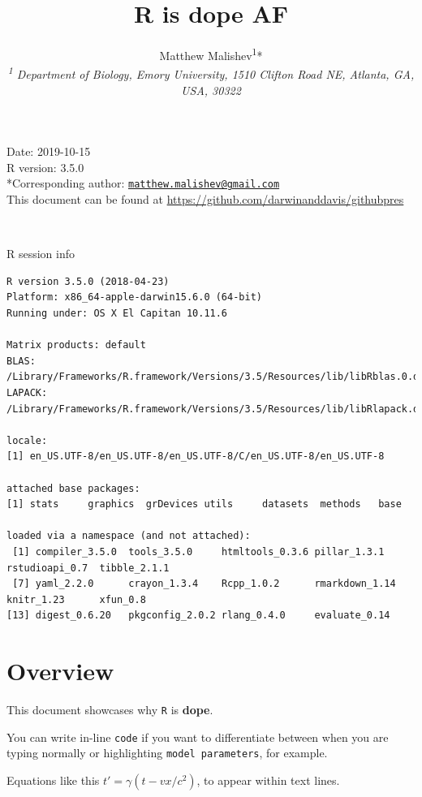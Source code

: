 \documentclass[10,portrait]{article}
\title{R is dope AF}
\author{Matthew
Malishev\textsuperscript{1}*\\[2\baselineskip]\emph{\textsuperscript{1}
Department of Biology, Emory University, 1510 Clifton Road NE, Atlanta,
GA, USA, 30322}}
\date{}
\begin{document}
\maketitle

{
\hypersetup{linkcolor=black}
\setcounter{tocdepth}{4}
\tableofcontents
}
\newpage   

Date: 2019-10-15\\
R version: 3.5.0\\
*Corresponding author:
\href{mailto:matthew.malishev@gmail.com}{\nolinkurl{matthew.malishev@gmail.com}}\\
This document can be found at
\url{https://github.com/darwinanddavis/githubpres}

~

R session info

\begin{verbatim}
R version 3.5.0 (2018-04-23)
Platform: x86_64-apple-darwin15.6.0 (64-bit)
Running under: OS X El Capitan 10.11.6

Matrix products: default
BLAS: /Library/Frameworks/R.framework/Versions/3.5/Resources/lib/libRblas.0.dylib
LAPACK: /Library/Frameworks/R.framework/Versions/3.5/Resources/lib/libRlapack.dylib

locale:
[1] en_US.UTF-8/en_US.UTF-8/en_US.UTF-8/C/en_US.UTF-8/en_US.UTF-8

attached base packages:
[1] stats     graphics  grDevices utils     datasets  methods   base     

loaded via a namespace (and not attached):
 [1] compiler_3.5.0  tools_3.5.0     htmltools_0.3.6 pillar_1.3.1    rstudioapi_0.7  tibble_2.1.1   
 [7] yaml_2.2.0      crayon_1.3.4    Rcpp_1.0.2      rmarkdown_1.14  knitr_1.23      xfun_0.8       
[13] digest_0.6.20   pkgconfig_2.0.2 rlang_0.4.0     evaluate_0.14  
\end{verbatim}

\newpage  

\section{Overview}\label{overview}

This document showcases why \texttt{R} is \textbf{dope}.

You can write in-line \texttt{code} if you want to differentiate between
when you are typing normally or highlighting \texttt{model\ parameters},
for example.

Equations like this \(t' = \gamma(t - vx/c^{2})\), to appear within text
lines.
\end{document}
